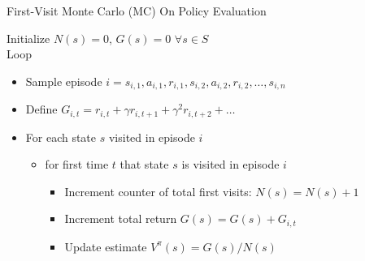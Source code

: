 \begin{frame}[c]{First-Visit Monte Carlo (MC) On Policy Evaluation}

Initialize $N(s) = 0$, $G(s) = 0$ $\forall s \in S$\\
Loop 
\begin{itemize}
	\item Sample episode $i = s_{i,1}, a_{i,1}, r_{i,1}, s_{i,2}, a_{i,2}, r_{i,2}, \ldots,s_{i,n}$
	\item Define $G_{i,t} = r_{i,t} + \gamma r_{i,t+1} + \gamma^2 r_{i,t+2} + \ldots$
	\item For each state $s$ visited in episode $i$
	\begin{itemize}
		\item for first time $t$ that state $s$ is visited in episode $i$
		\begin{itemize}
			\item Increment counter of total first visits: $N(s) = N(s) + 1$
			\item Increment total return $G(s) = G(s) + G_{i,t}$
			\item Update estimate $V^\pi (s) = G(s) /N(s)$
		\end{itemize}
	\end{itemize}
\end{itemize}
	
\end{frame}

